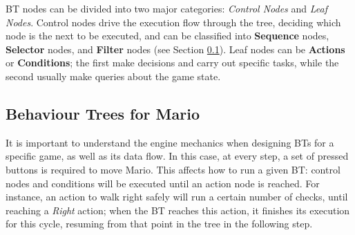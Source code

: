 \documentclass[conference]{IEEEtran}
\begin{document}

BT nodes can be divided into two major categories:
\textit{Control Nodes} and \textit{Leaf Nodes}. Control nodes drive
the execution flow through the tree, deciding which node is the next to 
be executed, and can be classified into \textbf{Sequence} nodes,
\textbf{Selector} nodes, and \textbf{Filter} nodes (see Section \ref{subsec:bt4Mario}).
Leaf nodes can be \textbf{Actions} or \textbf{Conditions}; the first
make decisions and carry out specific tasks, while the second usually 
make queries about the game state.


\subsection{Behaviour Trees for Mario} \label{subsec:bt4Mario}

It is important to understand the engine mechanics
when designing BTs for a specific game, as well as its data flow.
In this case, at every step, a set of pressed buttons is required to move Mario.
This affects how to run a given BT: control nodes and conditions
will be executed until an action node is reached. For instance,
an action to walk right safely will run a certain number of checks,
until reaching a \textit{Right} action; when the 
BT reaches this action, it finishes its execution for this cycle, resuming 
from that point in the tree in the following step.

\end{document}
